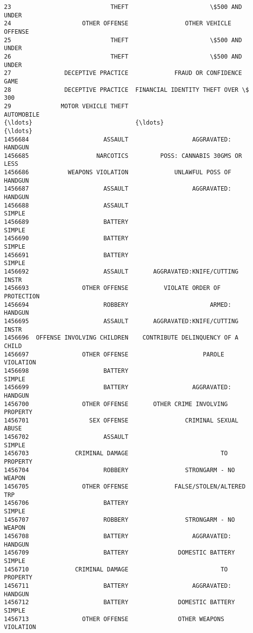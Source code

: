 \documentclass[11pt]{article}
\begin{document}
\begin{Verbatim}[commandchars=\\\{\}]
23                            THEFT                       \$500 AND UNDER   
24                    OTHER OFFENSE                OTHER VEHICLE OFFENSE   
25                            THEFT                       \$500 AND UNDER   
26                            THEFT                       \$500 AND UNDER   
27               DECEPTIVE PRACTICE             FRAUD OR CONFIDENCE GAME   
28               DECEPTIVE PRACTICE  FINANCIAL IDENTITY THEFT OVER \$ 300   
29              MOTOR VEHICLE THEFT                           AUTOMOBILE   
{\ldots}                             {\ldots}                                  {\ldots}   
1456684                     ASSAULT                  AGGRAVATED: HANDGUN   
1456685                   NARCOTICS         POSS: CANNABIS 30GMS OR LESS   
1456686           WEAPONS VIOLATION             UNLAWFUL POSS OF HANDGUN   
1456687                     ASSAULT                  AGGRAVATED: HANDGUN   
1456688                     ASSAULT                               SIMPLE   
1456689                     BATTERY                               SIMPLE   
1456690                     BATTERY                               SIMPLE   
1456691                     BATTERY                               SIMPLE   
1456692                     ASSAULT       AGGRAVATED:KNIFE/CUTTING INSTR   
1456693               OTHER OFFENSE          VIOLATE ORDER OF PROTECTION   
1456694                     ROBBERY                       ARMED: HANDGUN   
1456695                     ASSAULT       AGGRAVATED:KNIFE/CUTTING INSTR   
1456696  OFFENSE INVOLVING CHILDREN    CONTRIBUTE DELINQUENCY OF A CHILD   
1456697               OTHER OFFENSE                     PAROLE VIOLATION   
1456698                     BATTERY                               SIMPLE   
1456699                     BATTERY                  AGGRAVATED: HANDGUN   
1456700               OTHER OFFENSE       OTHER CRIME INVOLVING PROPERTY   
1456701                 SEX OFFENSE                CRIMINAL SEXUAL ABUSE   
1456702                     ASSAULT                               SIMPLE   
1456703             CRIMINAL DAMAGE                          TO PROPERTY   
1456704                     ROBBERY                STRONGARM - NO WEAPON   
1456705               OTHER OFFENSE             FALSE/STOLEN/ALTERED TRP   
1456706                     BATTERY                               SIMPLE   
1456707                     ROBBERY                STRONGARM - NO WEAPON   
1456708                     BATTERY                  AGGRAVATED: HANDGUN   
1456709                     BATTERY              DOMESTIC BATTERY SIMPLE   
1456710             CRIMINAL DAMAGE                          TO PROPERTY   
1456711                     BATTERY                  AGGRAVATED: HANDGUN   
1456712                     BATTERY              DOMESTIC BATTERY SIMPLE   
1456713               OTHER OFFENSE              OTHER WEAPONS VIOLATION   


\end{Verbatim}
\end{document}

